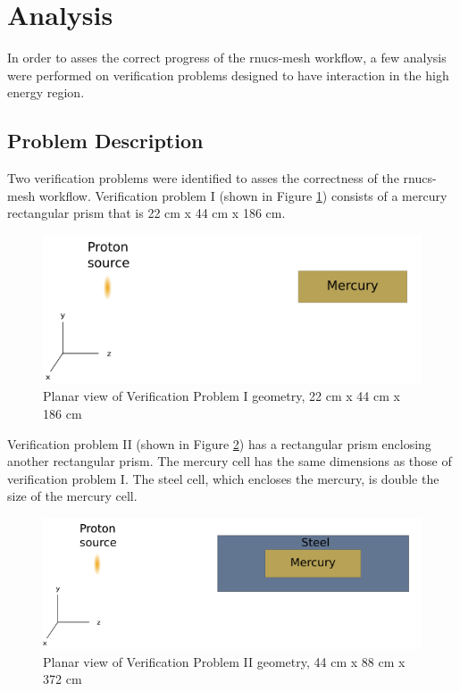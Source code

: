 \section{Analysis}\label{sc:analysis}
In order to asses the correct progress of the rnucs-mesh workflow, a few 
analysis were performed on verification problems designed to have interaction in the 
high energy region. 

\subsection{Problem Description}
Two verification problems were identified to asses the correctness of the 
rnucs-mesh workflow. 
Verification problem I (shown in Figure \ref{TPI}) consists of a mercury rectangular prism that is 
22 cm x 44 cm x 186 cm. 

\begin{figure}[h!]
\begin{centering}
\includegraphics[width=0.60\linewidth]{../figs/mercury.png}
\caption{Planar view of Verification Problem I geometry, 22 cm  x 44 cm x 186 cm }
\label{TPI}
\end{centering}
\end{figure}
Verification problem II (shown in Figure \ref{TPII}) has a rectangular prism enclosing another rectangular
prism. 
The mercury cell has the same dimensions as those of verification problem I. The steel 
cell, which encloses the mercury, is double the size of the mercury cell. 
\begin{figure}[h!]
\begin{centering}
\includegraphics[width=0.70\linewidth]{../figs/mer_steel.png}
\caption{Planar view of Verification Problem II geometry, 44 cm x 88 cm x 372 cm }
\label{TPII}
\end{centering}
\end{figure}

